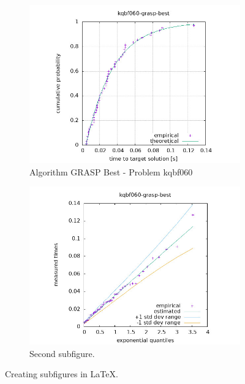 \begin{figure}[H]
    \centering
    \begin{subfigure}{0.49\textwidth}
        \includegraphics[width=\textwidth]{figure/ttt_plot/kqbf060-grasp-best-exp.jpeg}
        \caption{Algorithm GRASP Best - Problem kqbf060}
        \label{fig:grasp-best-kqbf060-exp}
    \end{subfigure}
    \hfill
    \begin{subfigure}{0.49\textwidth}
        \includegraphics[width=\textwidth]{figure/ttt_plot/kqbf060-grasp-best-qq.jpeg}
        \caption{Second subfigure.}
        \label{fig:grasp-best-kqbf060-qq}
    \end{subfigure}
    \caption{Creating subfigures in \LaTeX.}
    \label{fig:grasp-best-kqbf060}
\end{figure}


